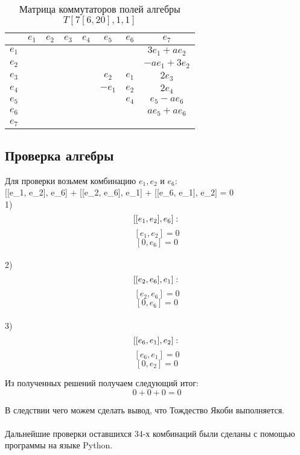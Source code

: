 \href{\href{}{}}{}\documentclass[14pt]{extarticle} %
\begin{document}
\begin{table}[h!]
    \centering
    \renewcommand{\arraystretch}{1.5}
    \setlength{\arrayrulewidth}{0.3mm}
    \begin{tabular}{|c|c|c|c|c|c|c|c|}
        \hline
    & $e_1$ & $e_2$ & $e_3$ & $e_4$ & $e_5$ & $e_6$ & $e_7$ \\
        \hline
        $e_1$ & & & & & & & $3e_1 + ae_2$\\
        \hline
        $e_2$ & & & & & & & $-ae_1+3e_2$\\
        \hline
        $e_3$ & & & & & $e_2$ & $e_1$ & $2e_3$\\
        \hline
        $e_4$ & & & & & $-e_1$ & $e_2$ & $2e_4$ \\
        \hline
        $e_5$ & & & & & & $e_4$ & $e_5-ae_6$ \\
        \hline
        $e_6$ & & & & & & & $ae_5+ae_6$ \\
        \hline
        $e_7$ & & & & & & & \\
        \hline
    \end{tabular}
    \caption{Матрица коммутаторов полей алгебры $T [7[6,20],1,1]$}
\end{table}



\subsection{Проверка алгебры}

Для проверки возьмем комбинацию \(e_1, e_2\) и \(e_6:\) \\

[[e_1, e_2], e_6] + [[e_2, e_6], e_1] + [[e_6, e_1], e_2] = 0 \\

1)
\[
 [[e_1, e_2], e_6]: \\
\]
\[
[e_1, e_2] = 0
\]
\[
[0, e_6] = 0
\] \\

2)
\[
[[e_2, e_6], e_1]: \\
\]
\[
[e_2, e_6] = 0
\]
\[
[0, e_6] = 0
\] \\

3)
\[
[[e_6, e_1], e_2]: \\
\]
\[
[e_6, e_1] = 0
\]
\[
[0, e_2] = 0
\]

Из полученных решений получаем следующий итог:
\[
0 + 0 + 0 = 0
\]

В следствии чего можем сделать вывод, что Тождество Якоби выполняется. \\
\\
Дальнейшие проверки оставшихся 34-х комбинаций были сделаны с помощью программы на языке Python.
\\
\end{document}
